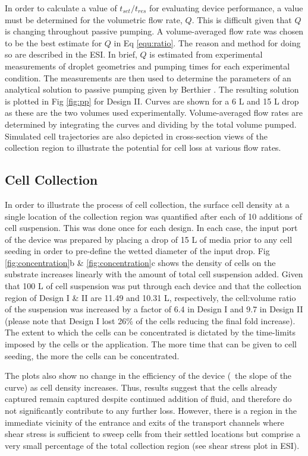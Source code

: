 In order to calculate a value of $t_{set}/t_{res}$ for evaluating device performance, a value must be determined for the volumetric flow rate, $Q$. This is difficult given that $Q$ is changing throughout passive pumping. A volume-averaged flow rate was chosen to be the best estimate for $Q$ in Eq \ref{equ:ratio}. The reason and method for doing so are described in the ESI. In brief, $Q$ is estimated from experimental measurements of droplet geometries and pumping times for each experimental condition. The measurements are then used to determine the parameters of an analytical solution to passive pumping given by Berthier \etal\cite{Berthier:2007mi}. The resulting solution is plotted in Fig \ref{fig:pp} for Design II. Curves are shown for a 6 \textmu L and 15 \textmu L drop as these are the two volumes used experimentally. Volume-averaged flow rates are determined by integrating the curves and dividing by the total volume pumped. Simulated cell trajectories are also depicted in cross-section views of the collection region to illustrate the potential for cell loss at various flow rates.

\subsection{Cell Collection}\label{sec:collection}

In order to illustrate the process of cell collection, the surface cell density at a single location of the collection region was quantified after each of 10 additions of cell suspension. This was done once for each design. In each case, the input port of the device was prepared by placing a drop of 15 \textmu L of media prior to any cell seeding in order to pre-define the wetted diameter of the input drop. Fig \ref{fig:concentration}b \& \ref{fig:concentration}c shows the density of cells on the substrate increases linearly with the amount of total cell suspension added. Given that 100 \textmu L of cell suspension was put through each device and that the collection region of Design I \& II are 11.49 and 10.31 \textmu L, respectively, the cell:volume ratio of the suspension was increased by a factor of 6.4 in Design I and 9.7 in Design II (please note that Design I lost 26\% of the cells reducing the final fold increase). The extent to which the cells can be concentrated is dictated by the time-limits imposed by the cells or the application. The more time that can be given to cell seeding, the more the cells can be concentrated. 

The plots also show no change in the efficiency of the device (\ie\ the slope of the curve) as cell density increases. Thus, results suggest that the cells already captured remain captured despite continued addition of fluid, and therefore do not significantly contribute to any further loss. However, there is a region in the immediate vicinity of  the entrance and exits of the transport channels where shear stress is sufficient to sweep cells from their settled locations but comprise a very small percentage of the total collection region (see shear stress plot in ESI).

